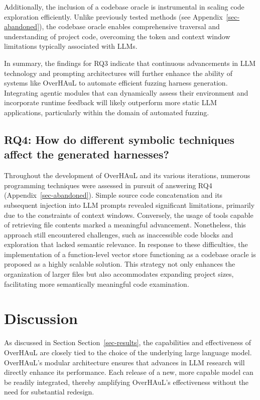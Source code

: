\documentclass[
  a4paper,
]{scrreprt}
\theoremstyle{definition}
\theoremstyle{remark}
\begin{document}
Additionally, the inclusion of a codebase oracle is instrumental in
scaling code exploration efficiently. Unlike previously tested methods
(see Appendix~\ref{sec-abandoned}), the codebase oracle enables
comprehensive traversal and understanding of project code, overcoming
the token and context window limitations typically associated with LLMs.

In summary, the findings for RQ3 indicate that continuous advancements
in LLM technology and prompting architectures will further enhance the
ability of systems like OverHAuL to automate efficient fuzzing harness
generation. Integrating agentic modules that can dynamically assess
their environment and incorporate runtime feedback will likely
outperform more static LLM applications, particularly within the domain
of automated fuzzing.

\subsection{RQ4: How do different symbolic techniques affect the
generated
harnesses?}\label{rq4-how-do-different-symbolic-techniques-affect-the-generated-harnesses}

Throughout the development of OverHAuL and its various iterations,
numerous programming techniques were assessed in pursuit of answering
RQ4 (Appendix~\ref{sec-abandoned}). Simple source code concatenation and
its subsequent injection into LLM prompts revealed significant
limitations, primarily due to the constraints of context windows.
Conversely, the usage of tools capable of retrieving file contents
marked a meaningful advancement. Nonetheless, this approach still
encountered challenges, such as inaccessible code blocks and exploration
that lacked semantic relevance. In response to these difficulties, the
implementation of a function-level vector store functioning as a
codebase oracle is proposed as a highly scalable solution. This strategy
not only enhances the organization of larger files but also accommodates
expanding project sizes, facilitating more semantically meaningful code
examination.

\section{Discussion}\label{discussion}

As discussed in Section Section~\ref{sec-results}, the capabilities and
effectiveness of OverHAuL are closely tied to the choice of the
underlying large language model. OverHAuL's modular architecture ensures
that advances in LLM research will directly enhance its performance.
Each release of a new, more capable model can be readily integrated,
thereby amplifying OverHAuL's effectiveness without the need for
substantial redesign.
\end{document}
